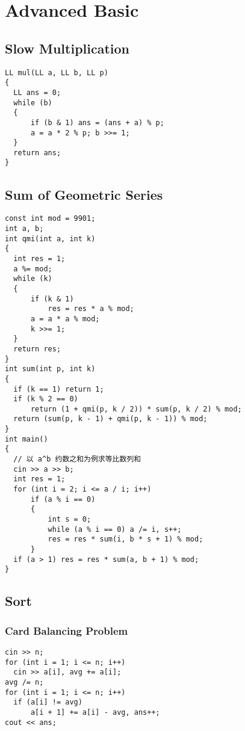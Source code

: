 \chapter{Advanced Basic}\label{chap:AdvancedBasic}
\section{Slow Multiplication}
\begin{lstlisting}
LL mul(LL a, LL b, LL p)
{
  LL ans = 0;
  while (b)
  {
      if (b & 1) ans = (ans + a) % p;
      a = a * 2 % p; b >>= 1;
  }
  return ans;
}
\end{lstlisting}
\section{Sum of Geometric Series}
\begin{lstlisting}
const int mod = 9901;
int a, b;
int qmi(int a, int k)
{
  int res = 1;
  a %= mod;
  while (k)
  {
      if (k & 1)
          res = res * a % mod;
      a = a * a % mod;
      k >>= 1;
  }
  return res;
}
int sum(int p, int k)
{
  if (k == 1) return 1;
  if (k % 2 == 0)
      return (1 + qmi(p, k / 2)) * sum(p, k / 2) % mod;
  return (sum(p, k - 1) + qmi(p, k - 1)) % mod;
}
int main()
{
  // 以 a^b 约数之和为例求等比数列和
  cin >> a >> b;
  int res = 1;
  for (int i = 2; i <= a / i; i++)
      if (a % i == 0)
      {
          int s = 0;
          while (a % i == 0) a /= i, s++;
          res = res * sum(i, b * s + 1) % mod;
      }
  if (a > 1) res = res * sum(a, b + 1) % mod;
}
\end{lstlisting}
\section{Sort}
\subsection{Card Balancing Problem}
\begin{lstlisting}
cin >> n;
for (int i = 1; i <= n; i++)
  cin >> a[i], avg += a[i];
avg /= n;
for (int i = 1; i <= n; i++)
  if (a[i] != avg)
      a[i + 1] += a[i] - avg, ans++;
cout << ans;
\end{lstlisting}
